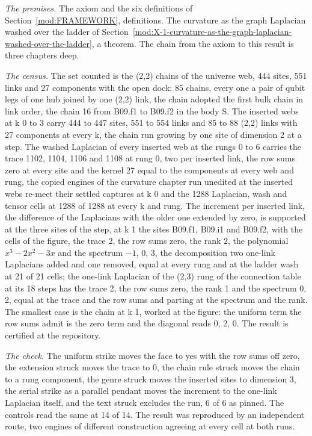 \begin{chproof}
\textit{The premises.} The axiom and the six definitions of Section~\ref{mod:FRAMEWORK}, definitions. The curvature as the graph Laplacian washed over the ladder of Section~\ref{mod:X-1-curvature-as-the-graph-laplacian-washed-over-the-ladder}, a theorem. The chain from the axiom to this result is three chapters deep.

\textit{The census.} The set counted is the (2,2) chains of the universe web, 444 sites, 551 links and 27 components with the open dock: 85 chains, every one a pair of qubit legs of one hub joined by one (2,2) link, the chain adopted the first bulk chain in link order, the chain 16 from B09.f1 to B09.f2 in the body S. The inserted webs at k 0 to 3 carry 444 to 447 sites, 551 to 554 links and 85 to 88 (2,2) links with 27 components at every k, the chain run growing by one site of dimension 2 at a step. The washed Laplacian of every inserted web at the rungs 0 to 6 carries the trace 1102, 1104, 1106 and 1108 at rung 0, two per inserted link, the row sums zero at every site and the kernel 27 equal to the components at every web and rung, the copied engines of the curvature chapter run unedited at the inserted webs re-meet their settled captures at k 0 and the 1288 Laplacian, wash and tensor cells at 1288 of 1288 at every k and rung. The increment per inserted link, the difference of the Laplacians with the older one extended by zero, is supported at the three sites of the step, at k 1 the sites B09.f1, B09.i1 and B09.f2, with the cells of the figure, the trace 2, the row sums zero, the rank 2, the polynomial $x^3 - 2x^2 - 3x$ and the spectrum $-1$, 0, 3, the decomposition two one-link Laplacians added and one removed, equal at every rung and at the ladder wash at 21 of 21 cells; the one-link Laplacian of the (2,3) rung of the connection table at its 18 steps has the trace 2, the row sums zero, the rank 1 and the spectrum 0, 2, equal at the trace and the row sums and parting at the spectrum and the rank. The smallest case is the chain at k 1, worked at the figure: the uniform term the row sums admit is the zero term and the diagonal reads 0, 2, 0. The result is certified at the repository.

\textit{The check.} The uniform strike moves the face to yes with the row sums off zero, the extension struck moves the trace to 0, the chain rule struck moves the chain to a rung component, the genre struck moves the inserted sites to dimension 3, the serial strike as a parallel pendant moves the increment to the one-link Laplacian itself, and the text struck excludes the run, 6 of 6 as pinned. The controls read the same at 14 of 14. The result was reproduced by an independent route, two engines of different construction agreeing at every cell at both runs.
\end{chproof}
